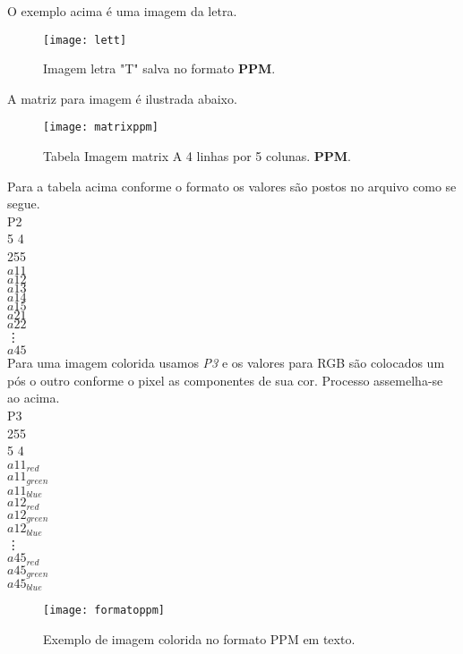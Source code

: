 \documentclass[12pt,a4paper]{article}
\begin{document}
	\noindent
	O exemplo acima é uma imagem da letra.
	
	\begin{figure}[h]
		\centering
		\texttt{[image: lett]}
		\caption{Imagem letra "T" salva no formato \textbf{PPM}.}
		\label{fig:lett}
	\end{figure}
	
	
	A matriz para imagem é ilustrada abaixo.
	\begin{figure}[h]
		\centering
		\texttt{[image: matrixppm]}
		\caption{Tabela Imagem matrix A 4 linhas por 5 colunas. \textbf{PPM}.}
		\label{fig:lett}
	\end{figure}
	

	Para a tabela acima conforme o formato os valores são postos no arquivo como se segue. \\

	\noindent	
	P2\\
	5 4\\
	255\\
	$a11$\\
	$a12$\\
	$a13$\\
	$a14$\\
	$a15$\\
	$a21$\\
	$a22$\\
	\vdots\\
	$a45$\\

	
	Para uma imagem colorida usamos \textit{P3} e os valores para RGB são colocados um pós o outro conforme o pixel as componentes de sua cor. Processo assemelha-se ao acima.\\
	
	\noindent
	P3 \\
	255 \\
	5 4 \\
	$a11_{red}$\\
	$a11_{green}$\\
	$a11_{blue}$\\
	$a12_{red}$\\
	$a12_{green}$\\
	$a12_{blue}$\\
	\vdots\\
	$a45_{red}$\\
	$a45_{green}$\\
	$a45_{blue}$\\
	
	\begin{figure}[h]
		\centering
		\texttt{[image: formatoppm]}
		\caption{Exemplo de imagem colorida no formato PPM em texto.}
		\label{fig:formatoppm}
	\end{figure}
	
\end{document}
